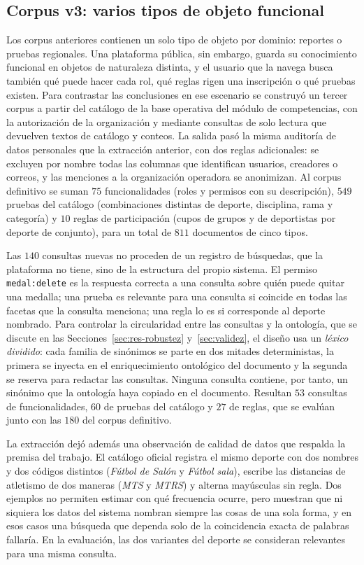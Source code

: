 \documentclass[11pt,letterpaper]{article}
\numberwithin{equation}{section}
\begin{document}
\subsection{Corpus v3: varios tipos de objeto funcional}
\label{sec:res-v3}
Los corpus anteriores contienen un solo tipo de objeto por dominio: reportes o pruebas regionales. Una plataforma pública, sin embargo, guarda su conocimiento funcional en objetos de naturaleza distinta, y el usuario que la navega busca también qué puede hacer cada rol, qué reglas rigen una inscripción o qué pruebas existen. Para contrastar las conclusiones en ese escenario se construyó un tercer corpus a partir del catálogo de la base operativa del módulo de competencias, con la autorización de la organización y mediante consultas de solo lectura que devuelven textos de catálogo y conteos. La salida pasó la misma auditoría de datos personales que la extracción anterior, con dos reglas adicionales: se excluyen por nombre todas las columnas que identifican usuarios, creadores o correos, y las menciones a la organización operadora se anonimizan. Al corpus definitivo se suman $75$ funcionalidades (roles y permisos con su descripción), $549$ pruebas del catálogo (combinaciones distintas de deporte, disciplina, rama y categoría) y $10$ reglas de participación (cupos de grupos y de deportistas por deporte de conjunto), para un total de $811$ documentos de cinco tipos.

Las $140$ consultas nuevas no proceden de un registro de búsquedas, que la plataforma no tiene, sino de la estructura del propio sistema. El permiso \texttt{medal:delete} es la respuesta correcta a una consulta sobre quién puede quitar una medalla; una prueba es relevante para una consulta si coincide en todas las facetas que la consulta menciona; una regla lo es si corresponde al deporte nombrado. Para controlar la circularidad entre las consultas y la ontología, que se discute en las Secciones~\ref{sec:res-robustez} y~\ref{sec:validez}, el diseño usa un \emph{léxico dividido}: cada familia de sinónimos se parte en dos mitades deterministas, la primera se inyecta en el enriquecimiento ontológico del documento y la segunda se reserva para redactar las consultas. Ninguna consulta contiene, por tanto, un sinónimo que la ontología haya copiado en el documento. Resultan $53$ consultas de funcionalidades, $60$ de pruebas del catálogo y $27$ de reglas, que se evalúan junto con las $180$ del corpus definitivo.

La extracción dejó además una observación de calidad de datos que respalda la premisa del trabajo. El catálogo oficial registra el mismo deporte con dos nombres y dos códigos distintos (\emph{Fútbol de Salón} y \emph{Fútbol sala}), escribe las distancias de atletismo de dos maneras (\emph{MTS} y \emph{MTRS}) y alterna mayúsculas sin regla. Dos ejemplos no permiten estimar con qué frecuencia ocurre, pero muestran que ni siquiera los datos del sistema nombran siempre las cosas de una sola forma, y en esos casos una búsqueda que dependa solo de la coincidencia exacta de palabras fallaría. En la evaluación, las dos variantes del deporte se consideran relevantes para una misma consulta.
\end{document}
